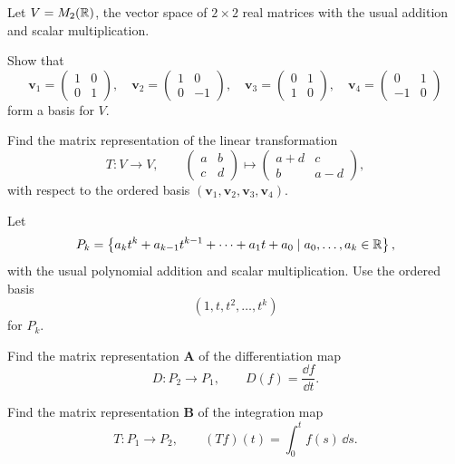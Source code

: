 \documentclass[11pt,oneside]{article}
\begin{document}
\begin{problem}
Let $V=M_2(\mathbb{R})$, the vector space of $2\times2$ real matrices with the usual addition and scalar multiplication.
\begin{problemsubparts}
\item Show that
\[
\mathbf v_1=
\begin{pmatrix}
1&0\\0&1
\end{pmatrix},
\quad
\mathbf v_2=
\begin{pmatrix}
1&0\\0&-1
\end{pmatrix},
\quad
\mathbf v_3=
\begin{pmatrix}
0&1\\1&0
\end{pmatrix},
\quad
\mathbf v_4=
\begin{pmatrix}
0&1\\-1&0
\end{pmatrix}
\]
form a basis for $V$.
\item Find the matrix representation of the linear transformation
\[
T\colon V\to V,
\qquad
\begin{pmatrix}
a&b\\c&d
\end{pmatrix}
\mapsto
\begin{pmatrix}
a+d&c\\b&a-d
\end{pmatrix},
\]
with respect to the ordered basis $(\mathbf v_1,\mathbf v_2,\mathbf v_3,\mathbf v_4)$.
\end{problemsubparts}
\end{problem}

\begin{problem}
Let
\[
P_k=\left\{a_k t^k+a_{k-1}t^{k-1}+\cdots+a_1t+a_0\mid a_0,\dots,a_k\in\mathbb{R}\right\},
\]
with the usual polynomial addition and scalar multiplication. Use the ordered basis
\[
(1,t,t^2,\dots,t^k)
\]
for $P_k$.
\begin{problemsubparts}
\item Find the matrix representation $\mathbf A$ of the differentiation map
\[
D\colon P_2\to P_1,
\qquad
D(f)=\frac{\dd f}{\dd t}.
\]
\item Find the matrix representation $\mathbf B$ of the integration map
\[
T\colon P_1\to P_2,
\qquad
(Tf)(t)=\int_0^t f(s)\,\dd s.
\]
\end{problemsubparts}
\end{problem}
\end{document}
